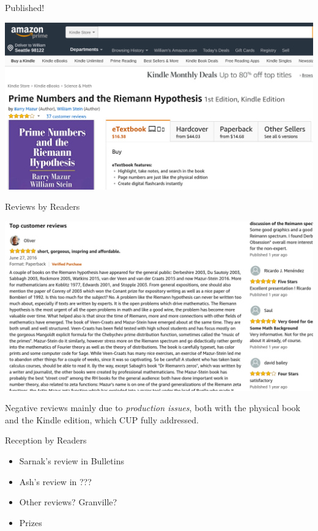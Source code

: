 \documentclass{beamer}
\begin{document}
\begin{frame}{Published!}

  \includegraphics[width=.98\textwidth]{pics/amazon-prime}

\end{frame}



\begin{frame}{Reviews by Readers}

  \includegraphics[width=.95\textwidth]{pics/amazon-review}

  \hrulefill

  \vfill

  Negative reviews  mainly due to \textit{production issues},
  both with the physical book
  and the Kindle edition, which CUP fully addressed.

\end{frame}

\begin{frame}{Reception by Readers}
  \begin{itemize}
    \item Sarnak's review in Bulletins
    \item Ash's review in ???
    \item Other reviews?  Granville?
    \item Prizes
  \end{itemize}
\end{frame}
\end{document}
